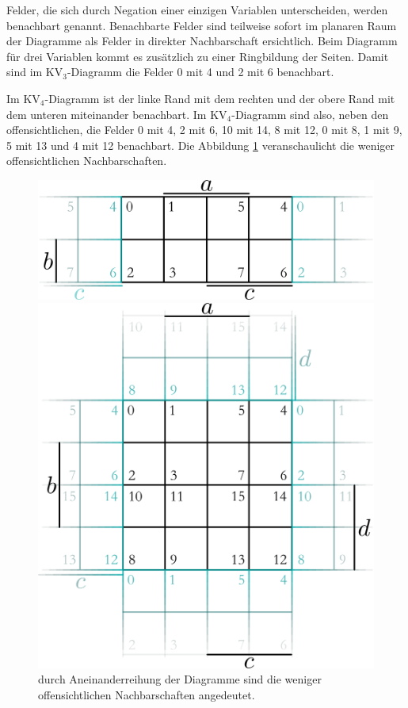 \documentclass[11pt,a4paper]{scrreprt}
\begin{document}
Felder, die sich durch Negation einer einzigen Variablen unterscheiden, werden benachbart genannt. Benachbarte Felder sind teilweise sofort im planaren Raum der Diagramme als Felder in direkter Nachbarschaft ersichtlich. Beim Diagramm für drei Variablen kommt es zusätzlich zu einer Ringbildung der Seiten. Damit sind im KV$_3$-Diagramm die Felder 0 mit 4 und 2 mit 6 benachbart. 

Im KV$_4$-Diagramm ist der linke Rand mit dem rechten und der obere Rand mit dem unteren miteinander benachbart. Im KV$_4$-Diagramm sind also, neben den offensichtlichen, die Felder 0 mit 4, 2 mit 6, 10 mit 14, 8 mit 12, 0 mit 8, 1 mit 9, 5 mit 13 und 4 mit 12 benachbart. Die Abbildung \ref{KVdiag_nachbarschaften} veranschaulicht die weniger offensichtlichen Nachbarschaften.

\begin{figure}[htbp] %
	\centering
	\includegraphics[scale = 0.5]{KV3diagramm_Nachbarschaften.png}
	
	\vspace{.6cm}
	
	\includegraphics[scale = 0.5]{KV4diagramm_Nachbarschaften.png}
	\caption{durch Aneinanderreihung der Diagramme sind die weniger offensichtlichen Nachbarschaften angedeutet.}
	\label{KVdiag_nachbarschaften}
\end{figure}
\end{document}
